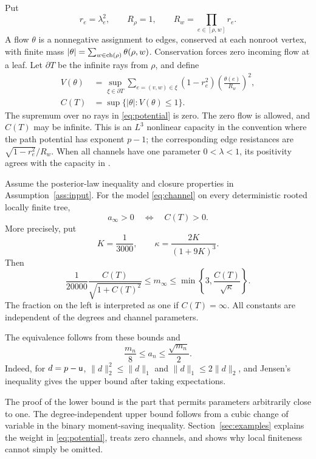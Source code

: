 Put
\[
 r_e=\lambda_e^2,\qquad R_\rho=1,\qquad
 R_w=\prod_{e\in[\rho,w]}r_e.
\]
A flow $\theta$ is a nonnegative assignment to edges, conserved at each
nonroot vertex, with finite mass
$|\theta|=\sum_{w\in\operatorname{ch}(\rho)}\theta(\rho,w)$.
Conservation forces zero incoming flow at a leaf. Let $\partial T$ be
the infinite rays from $\rho$, and define
\begin{align}
 V(\theta)&=\sup_{\xi\in\partial T}
  \sum_{e=(v,w)\in\xi}(1-r_e^2)
             \left(\frac{\theta(e)}{R_w}\right)^2,\label{eq:potential}\\
 C(T)&=\sup\{|\theta|:V(\theta)\leq1\}.\label{eq:capacity}
\end{align}
The supremum over no rays in \eqref{eq:potential} is zero. The zero
flow is allowed, and $C(T)$ may be infinite. This is an $L^3$ nonlinear
capacity in the convention where the path potential has exponent $p-1$;
the corresponding edge resistances are
$\sqrt{1-r_e^2}/R_w$. When all channels have one parameter
$0<\lambda<1$, its positivity agrees with the capacity in
\cite{Capacity}.

\begin{theorem}\label{thm:main}
Assume the posterior-law inequality and closure properties in
Assumption~\ref{ass:input}. For the model \eqref{eq:channel} on every
deterministic rooted locally finite tree,
\[
 a_\infty>0\quad\Longleftrightarrow\quad C(T)>0.
\]
More precisely, put
\[
 K=\frac1{3000},\qquad \kappa=\frac{2K}{(1+9K)^3}.
\]
Then
\begin{equation}\label{eq:main-bounds}
 \frac1{20000}\frac{C(T)}{\sqrt{1+C(T)^2}}
 \leq m_\infty
 \leq\min\left\{3,\frac{C(T)}{\sqrt\kappa}\right\}.
\end{equation}
The fraction on the left is interpreted as one if $C(T)=\infty$.
All constants are independent of the degrees and channel parameters.
\end{theorem}

The equivalence follows from these bounds and
\begin{equation}\label{eq:tv}
 \frac{m_n}{8}\leq a_n\leq\frac{\sqrt{m_n}}2.
\end{equation}
Indeed, for $d=p-\mathsf u$, $\lVert d\rVert_2^2\leq\lVert d\rVert_1$
and $\lVert d\rVert_1\leq2\lVert d\rVert_2$, and Jensen's
inequality gives the upper bound after taking expectations.

The proof of the lower bound is the part that permits parameters
arbitrarily close to one. The degree-independent upper bound follows
from a cubic change of variable in the binary moment-saving inequality.
Section~\ref{sec:examples}
explains the weight in \eqref{eq:potential}, treats zero channels, and
shows why local finiteness cannot simply be omitted.
